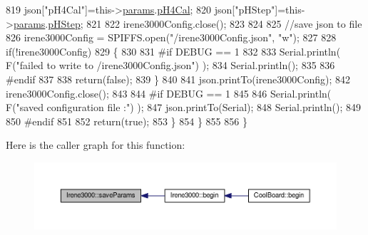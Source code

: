 \begin{DoxyCode}
819             json[\textcolor{stringliteral}{"pH4Cal"}]=this->\hyperlink{class_irene3000_a136585a5ee7f9ac6ab52175fa153f8e3}{params}.\hyperlink{struct_irene3000_1_1parameters___t_a1144de6fb54eb3e1dd2a3d8c2afc97dc}{pH4Cal};
820             json[\textcolor{stringliteral}{"pHStep"}]=this->\hyperlink{class_irene3000_a136585a5ee7f9ac6ab52175fa153f8e3}{params}.\hyperlink{struct_irene3000_1_1parameters___t_a61cfcc2539d5f630e9071f3753aba9fe}{pHStep};         
821             
822             irene3000Config.close();
823             
824             
825             \textcolor{comment}{//save json to file}
826             irene3000Config = SPIFFS.open(\textcolor{stringliteral}{"/irene3000Config.json"}, \textcolor{stringliteral}{"w"});
827 
828             \textcolor{keywordflow}{if}(!irene3000Config)
829             \{
830             
831 \textcolor{preprocessor}{            #if DEBUG == 1}
832 
833                 Serial.println( F(\textcolor{stringliteral}{"failed to write to /irene3000Config.json"}) );
834                 Serial.println();
835             
836 \textcolor{preprocessor}{            #endif }
837 
838                 \textcolor{keywordflow}{return}(\textcolor{keyword}{false});
839             \}
840 
841             json.printTo(irene3000Config);
842             irene3000Config.close();
843             
844 \textcolor{preprocessor}{        #if DEBUG == 1 }
845 
846             Serial.println( F(\textcolor{stringliteral}{"saved configuration file :"})  );
847             json.printTo(Serial);
848             Serial.println();
849         
850 \textcolor{preprocessor}{        #endif}
851 
852             \textcolor{keywordflow}{return}(\textcolor{keyword}{true}); 
853         \}
854     \}   
855 
856 \}
\end{DoxyCode}
Here is the caller graph for this function\+:\nopagebreak
\begin{figure}[H]
\begin{center}
\leavevmode
\includegraphics[width=350pt]{d6/d03/class_irene3000_a63dbd38e79b8cd5f1fba4b245501a894_icgraph}
\end{center}
\end{figure}
\mbox{\label{class_irene3000_aff7c5da186b388e7272e63ff88a20c34}} 
